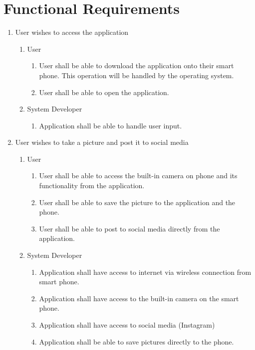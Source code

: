 \documentclass[]{article}
\begin{document}
\section{Functional Requirements}
\label{sec:functional_requirements}


\begin{enumerate}[{BE}1.]
	\item User wishes to access the application
	\begin{enumerate}[{VP1}.1]
		\item User
			\begin{enumerate}
				\item User shall be able to download the application onto their smart phone.  This operation will be handled by the operating system.
				\item User shall be able to open the application.
			\end{enumerate}
		\item System Developer
			\begin{enumerate}
				\item Application shall be able to handle user input.
			\end{enumerate}
	\end{enumerate}
	\item User wishes to take a picture and post it to social media
	\begin{enumerate}[{VP2}.1]
		\item User
			\begin{enumerate}
				\item User shall be able to access the built-in camera on phone and its functionality from the application.
				\item User shall be able to save the picture to the application and the phone.
				\item User shall be able to post to social media directly from the application.
			\end{enumerate}
		\item System Developer
			\begin{enumerate}
				\item Application shall have access to internet via wireless connection from smart phone.
				\item Application shall have access to the built-in camera on the smart phone.
				\item Application shall have access to social media (Instagram)
				\item Application shall be able to save pictures directly to the phone.

\end{enumerate}
\end{enumerate}
\end{enumerate}
\end{document}
